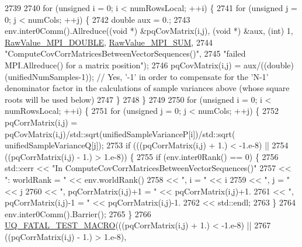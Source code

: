 \begin{DoxyCode}
2739 
2740       \textcolor{keywordflow}{for} (\textcolor{keywordtype}{unsigned} i = 0; i < numRowsLocal; ++i) \{
2741         \textcolor{keywordflow}{for} (\textcolor{keywordtype}{unsigned} j = 0; j < numCols; ++j) \{
2742           \textcolor{keywordtype}{double} aux = 0.;
2743           env.inter0Comm().Allreduce((\textcolor{keywordtype}{void} *) &pqCovMatrix(i,j), (\textcolor{keywordtype}{void} *) &aux, (\textcolor{keywordtype}{int}) 1, 
      \hyperlink{_mpi_comm_8h_ad0f503bd9fecfe4e570ca3d15aaf2518}{RawValue\_MPI\_DOUBLE}, \hyperlink{_mpi_comm_8h_afbf78d291c032aa7f512bc566cee2bd1}{RawValue\_MPI\_SUM},
2744                                      \textcolor{stringliteral}{"ComputeCovCorrMatricesBetweenVectorSequences()"},
2745                                      \textcolor{stringliteral}{"failed MPI.Allreduce() for a matrix position"});
2746           pqCovMatrix(i,j) = aux/((double) (unifiedNumSamples-1)); \textcolor{comment}{// Yes, '-1' in order to compensate for
       the 'N-1' denominator factor in the calculations of sample variances above (whose square roots will be used
       below)}
2747         \}
2748       \}
2749 
2750       \textcolor{keywordflow}{for} (\textcolor{keywordtype}{unsigned} i = 0; i < numRowsLocal; ++i) \{
2751         \textcolor{keywordflow}{for} (\textcolor{keywordtype}{unsigned} j = 0; j < numCols; ++j) \{
2752           pqCorrMatrix(i,j) = pqCovMatrix(i,j)/std::sqrt(unifiedSampleVarianceP[i])/std::sqrt(
      unifiedSampleVarianceQ[j]);
2753           \textcolor{keywordflow}{if} (((pqCorrMatrix(i,j) + 1.) < -1.e-8) ||
2754               ((pqCorrMatrix(i,j) - 1.) >  1.e-8)) \{
2755             \textcolor{keywordflow}{if} (env.inter0Rank() == 0) \{
2756               std::cerr << \textcolor{stringliteral}{"In ComputeCovCorrMatricesBetweenVectorSequences()"}
2757                         << \textcolor{stringliteral}{": worldRank = "}            << env.worldRank()
2758                         << \textcolor{stringliteral}{", i = "}                   << i
2759                         << \textcolor{stringliteral}{", j = "}                   << j
2760                         << \textcolor{stringliteral}{", pqCorrMatrix(i,j)+1 = "} << pqCorrMatrix(i,j)+1.
2761                         << \textcolor{stringliteral}{", pqCorrMatrix(i,j)-1 = "} << pqCorrMatrix(i,j)-1.
2762                         << std::endl;
2763             \}
2764             env.inter0Comm().Barrier();
2765           \}
2766           \hyperlink{_defines_8h_a56d63d18d0a6d45757de47fcc06f574d}{UQ\_FATAL\_TEST\_MACRO}(((pqCorrMatrix(i,j) + 1.) < -1.e-8) ||
2767                               ((pqCorrMatrix(i,j) - 1.) >  1.e-8),

\end{DoxyCode}
